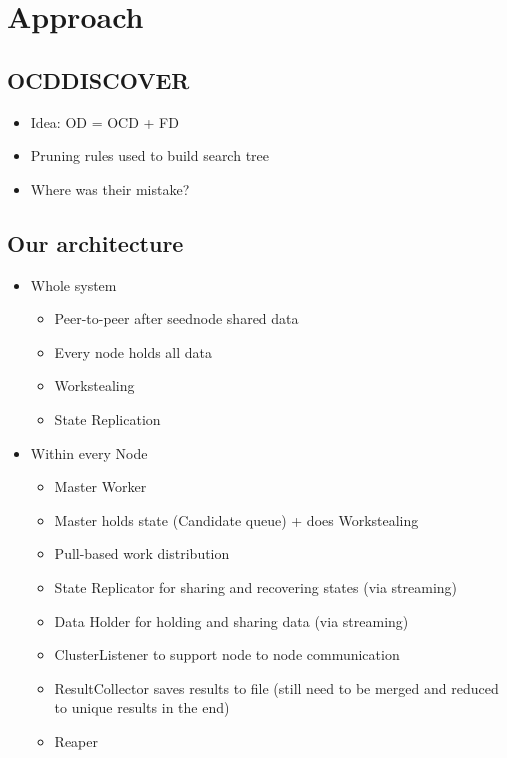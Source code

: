 
\section{Approach}\label{sec:approach}
 
\subsection{OCDDISCOVER}
\begin{itemize}
	\item Idea: OD = OCD + FD
	\item Pruning rules used to build search tree
	\item Where was their mistake?
\end{itemize}

\subsection{Our architecture}
\begin{itemize}
	\item Whole system
	\begin{itemize}
		\item Peer-to-peer after seednode shared data
		\item Every node holds all data
		\item Workstealing
		\item State Replication
	\end{itemize}
	\item Within every Node
	\begin{itemize}
		\item Master Worker
		\item Master holds state (Candidate queue) + does Workstealing
		\item Pull-based work distribution
		\item State Replicator for sharing and recovering states (via streaming)
		\item Data Holder for holding and sharing data (via streaming)
		\item ClusterListener to support node to node communication
		\item ResultCollector saves results to file (still need to be merged and reduced to unique results in the end)
		\item Reaper
	\end{itemize}
\end{itemize}

